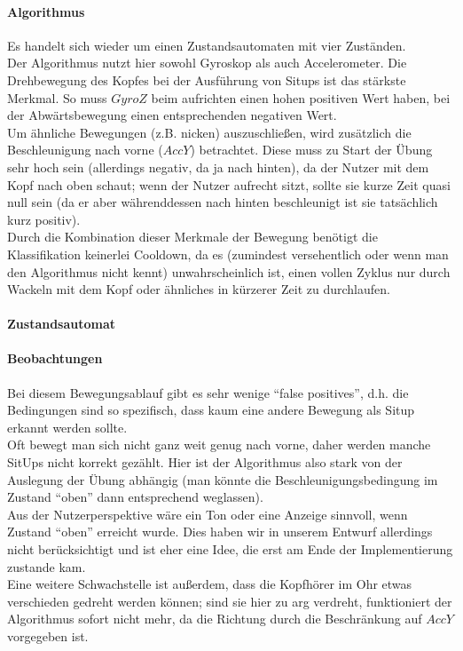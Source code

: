 \documentclass[a4paper,12pt]{article}
\begin{document}
\paragraph{Algorithmus}
Es handelt sich wieder um einen Zustandsautomaten mit vier Zuständen.\\
Der Algorithmus nutzt hier sowohl Gyroskop als auch Accelerometer. Die Drehbewegung des Kopfes bei der Ausführung von Situps ist das stärkste Merkmal. So muss $GyroZ$ beim aufrichten einen hohen positiven Wert haben, bei der Abwärtsbewegung einen entsprechenden negativen Wert.\\
Um ähnliche Bewegungen (z.B. nicken) auszuschließen, wird zusätzlich die Beschleunigung nach vorne ($AccY$) betrachtet. Diese muss zu Start der Übung sehr hoch sein (allerdings negativ, da ja nach hinten), da der Nutzer mit dem Kopf nach oben schaut; wenn der Nutzer aufrecht sitzt, sollte sie kurze Zeit quasi null sein (da er aber währenddessen nach hinten beschleunigt ist sie tatsächlich kurz positiv).\\
Durch die Kombination dieser Merkmale der Bewegung benötigt die Klassifikation keinerlei Cooldown, da es (zumindest versehentlich oder wenn man den Algorithmus nicht kennt) unwahrscheinlich ist, einen vollen Zyklus nur durch Wackeln mit dem Kopf oder ähnliches in kürzerer Zeit zu durchlaufen.
\paragraph{Zustandsautomat}

\paragraph{Beobachtungen}
Bei diesem Bewegungsablauf gibt es sehr wenige ``false positives'', d.h. die Bedingungen sind so spezifisch, dass kaum eine andere Bewegung als Situp erkannt werden sollte.\\
Oft bewegt man sich nicht ganz weit genug nach vorne, daher werden manche SitUps nicht korrekt gezählt. Hier ist der Algorithmus also stark von der Auslegung der Übung abhängig (man könnte die Beschleunigungsbedingung im Zustand ``oben'' dann entsprechend weglassen).\\
Aus der Nutzerperspektive wäre ein Ton oder eine Anzeige sinnvoll, wenn Zustand ``oben'' erreicht wurde. Dies haben wir in unserem Entwurf allerdings nicht berücksichtigt und ist eher eine Idee, die erst am Ende der Implementierung zustande kam.\\
Eine weitere Schwachstelle ist außerdem, dass die Kopfhörer im Ohr etwas verschieden gedreht werden können; sind sie hier zu arg verdreht, funktioniert der Algorithmus sofort nicht mehr, da die Richtung durch die Beschränkung auf $AccY$ vorgegeben ist.
\end{document}
